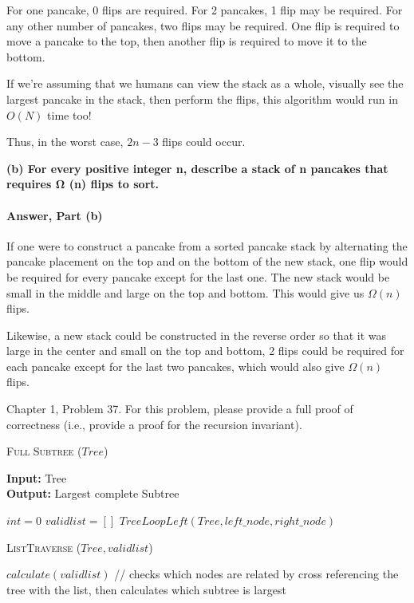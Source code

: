 \documentclass{article}
\begin{document}
For one pancake, 0 flips are required. For 2 pancakes, 1 flip may be required. For any other number of pancakes,
two flips may be required. One flip is required to move a pancake to the top, then another flip is required to
move it to the bottom.

If we're assuming that we humans can view the stack as a whole, visually see the largest pancake in the stack,
then perform the flips, this algorithm would run in $O (N)$ time too!

Thus, in the worst case, $2n - 3$ flips could occur.

{\bf (b) For every positive integer n, describe a stack of n pancakes that requires
Ω (n) flips to sort.}

\paragraph{Answer, Part (b)}

If one were to construct a pancake from a sorted pancake stack by alternating the pancake placement on the
top and on the bottom of the new stack, one flip would be required for every pancake except for the last one.
The new stack would be small in the middle and large on the top and bottom. This would give us $\Omega(n)$ flips.

Likewise, a new stack could be constructed in the reverse order so that it was large in the center and small on
the top and bottom, 2 flips could be required for each pancake except for the last two pancakes, which would
also give $\Omega(n)$ flips.

\collab{\todo{}}

Chapter 1, Problem 37.  For this problem, please provide a full proof of
correctness (i.e., provide a proof for the recursion invariant).

\begin{algorithm} \caption{\textsc{Full Subtree} ($Tree$)}\label{alg:seb}
    {\bf Input:} Tree\\
    {\bf Output:} Largest complete Subtree
    \begin{algorithmic}[1]
		\State$int=0$
		\State$valid list=[]$
        \State$TreeLoopLeft(Tree, left\_node, right\_node)$
    \end{algorithmic}
\end{algorithm}

\begin{algorithm} \caption{\textsc{ListTraverse} ($Tree, validlist$)}\label{alg:seb}
    \begin{algorithmic}[1]
        \State$calculate(validlist)$ // checks which nodes are related by cross referencing the tree with the list, then calculates which subtree is largest
    \end{algorithmic}
\end{algorithm}
\end{document}
